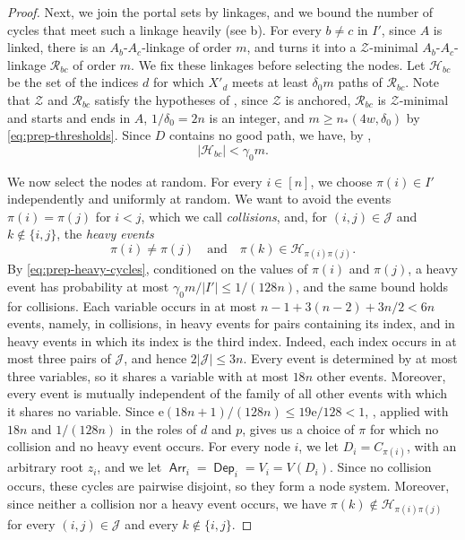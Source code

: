 \documentclass[fontsize=12pt,leading=14pt]{fullpaper}
\DeclareMathOperator{\Arr}{\mathsf{Arr}}
\DeclareMathOperator{\Dep}{\mathsf{Dep}}
\newcommand{\Hcal}{\mathcal{H}}
\newcommand{\Jcal}{\mathcal{J}}
\newcommand{\Rcal}{\mathcal{R}}
\newcommand{\Zcal}{\mathcal{Z}}
\begin{document}
\begin{proof}
  Next, we join the portal sets by linkages, and we bound the number of cycles that meet such a linkage heavily (see b).
  For every $b\ne c$ in $I'$, since $A$ is linked, there is an $A_b$-$A_c$-linkage of order $m$, and  turns it into a $\Zcal$-minimal $A_b$-$A_c$-linkage $\Rcal_{bc}$ of order $m$.
  We fix these linkages before selecting the nodes.
  Let $\Hcal_{bc}$ be the set of the indices $d$ for which $X'_d$ meets at least $\delta_0m$ paths of $\Rcal_{bc}$.
  Note that $\Zcal$ and $\Rcal_{bc}$ satisfy the hypotheses of , since $\Zcal$ is anchored, $\Rcal_{bc}$ is $\Zcal$-minimal and starts and ends in $A$, $1/\delta_0=2n$ is an integer, and $m\ge n_*(4w,\delta_0)$ by \eqref{eq:prep-thresholds}.
  Since $D$ contains no good path, we have, by ,
  \begin{equation}\label{eq:prep-heavy-cycles}
    |\Hcal_{bc}|<\gamma_0m.
  \end{equation}

  We now select the nodes at random.
  For every $i\in[n]$, we choose $\pi(i)\in I'$ independently and uniformly at random.
  We want to avoid the events $\pi(i)=\pi(j)$ for $i<j$, which we call \emph{collisions}, and, for $(i,j)\in\Jcal$ and $k\notin\{i,j\}$, the \emph{heavy events}
  \[
    \pi(i)\ne\pi(j)\quad\text{and}\quad\pi(k)\in\Hcal_{\pi(i)\pi(j)}.
  \]
  By \eqref{eq:prep-heavy-cycles}, conditioned on the values of $\pi(i)$ and $\pi(j)$, a heavy event has probability at most $\gamma_0m/|I'|\le1/(128n)$, and the same bound holds for collisions.
  Each variable occurs in at most $n-1+3(n-2)+3n/2<6n$ events, namely, in collisions, in heavy events for pairs containing its index, and in heavy events in which its index is the third index.
  Indeed, each index occurs in at most three pairs of $\Jcal$, and hence $2|\Jcal|\le3n$.
  Every event is determined by at most three variables, so it shares a variable with at most $18n$ other events.
  Moreover, every event is mutually independent of the family of all other events with which it shares no variable.
  Since $\mathrm e(18n+1)/(128n)\le19\mathrm e/128<1$, , applied with $18n$ and $1/(128n)$ in the roles of $d$ and $p$, gives us a choice of $\pi$ for which no collision and no heavy event occurs.
  For every node $i$, we let $D_i=C_{\pi(i)}$, with an arbitrary root $z_i$, and we let $\Arr_i=\Dep_i=V_i=V(D_i)$.
  Since no collision occurs, these cycles are pairwise disjoint, so they form a node system.
  Moreover, since neither a collision nor a heavy event occurs, we have $\pi(k)\notin\Hcal_{\pi(i)\pi(j)}$ for every $(i,j)\in\Jcal$ and every $k\notin\{i,j\}$.


\end{proof}
\end{document}
